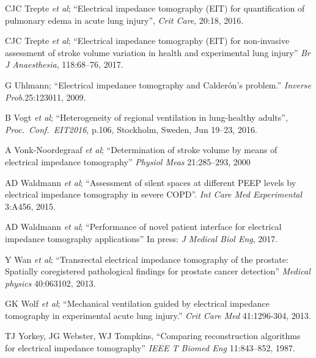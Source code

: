 \documentclass[12pt]{article} \usepackage[margin=3cm]{geometry} \usepackage[margin=20pt,font=small,labelfont=bf]{caption}\def\TBLWIDA{35mm}\def\TBLWIDB{95mm}
\newcommand{\ifmaxthree}[2]{#2 {\em et al}; }
\begin{document}
\begin{thebibliography}{00}
\ifmaxthree{
CJC Trepte, CR Phillips, J Solà, A Adler, SA Haas, M Rapin; SH Böhm, DA Reuter
}{
CJC Trepte
}
``Electrical impedance tomography (EIT) for quantification of pulmonary edema in acute lung injury'',
{\em Crit Care},  20:18, 2016.

\ifmaxthree{
CJC Trepte, C Phillips, J Solà, A Adler, B Saugel, S Haas, SH Böhm, DA Reuter
}{
CJC Trepte}
``Electrical impedance tomography (EIT) for non-invasive assessment of stroke volume variation in health and experimental lung injury''
{\em Br J Anaesthesia}, 118:68--76, 2017.

G Uhlmann;
``Electrical impedance tomography and Calderón's problem.''
{\em  Inverse Prob}.25:123011, 2009.

\ifmaxthree{
B Vogt, K Ehlers, V Hennig, Z Zhao, N Weiler, I Frerichs;
}{
B Vogt
}
``Heterogeneity of regional ventilation in lung-healthy adults'',
{\em Proc.~Conf.~EIT2016}, p.106, 
Stockholm, Sweden, Jun 19--23, 2016.

\ifmaxthree{
A Vonk-Noordegraaf, A Janse, JT Marcus, JGF Bronzwaer, PE Postmus, TJC Faes, PMJM de Vries,
}{
A Vonk-Noordegraaf
}
``Determination of stroke volume by means of electrical impedance tomography''
{\em Physiol Meas} 21:285--293, 2000 

\ifmaxthree{
AD Waldmann, PL Róka, SH Böhm, W Windisch, S Strassmann, C Karagiannidis.
}{
AD Waldmann
}
``Assessment of silent spaces at different PEEP levels by electrical impedance tomography in severe COPD''.
{\em Int Care Med Experimental} 3:A456, 2015.

\ifmaxthree{
AD Waldmann, KH Wodack, A März, A Ukere,
CJ Trepte, SH Böhm, DA Reuter
}{
AD Waldmann
}
``Performance of novel patient interface for electrical impedance
tomography applications''
In press: {\em J Medical Biol Eng}, 2017.

\ifmaxthree{
Y Wan, A Borsic, J Heaney, J Seigne, A Schned, M Baker, S Wason, A Hartov, R Halter
}{
Y Wan
}
``Transrectal electrical impedance tomography of the prostate: Spatially coregistered pathological findings for prostate cancer detection''
{\em Medical physics} 40:063102, 2013.

\ifmaxthree{
GK Wolf, C Gómez-Laberge, JS Rettig, SO Vargas, CD Smallwood, SP Prabhu, SH Vitali, D Zurakowski, JH Arnold
}{
GK Wolf
}
``Mechanical ventilation guided by electrical impedance tomography in experimental acute lung injury.''
{\em Crit Care Med} 41:1296-304, 2013. %

TJ Yorkey, JG Webster, WJ Tompkins,
``Comparing reconstruction algorithms for electrical impedance tomography''
{\em  IEEE T Biomed Eng} 11:843--852, 1987.

\end{thebibliography}
\end{document}
